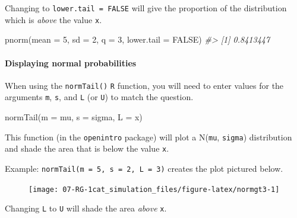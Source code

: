 \documentclass[
]{report}
\newenvironment{Shaded}{\begin{snugshade}}{\end{snugshade}}
\newcommand{\AttributeTok}[1]{\textcolor[rgb]{0.77,0.63,0.00}{#1}}
\newcommand{\CommentTok}[1]{\textcolor[rgb]{0.56,0.35,0.01}{\textit{#1}}}
\newcommand{\ConstantTok}[1]{\textcolor[rgb]{0.00,0.00,0.00}{#1}}
\newcommand{\DecValTok}[1]{\textcolor[rgb]{0.00,0.00,0.81}{#1}}
\newcommand{\FunctionTok}[1]{\textcolor[rgb]{0.00,0.00,0.00}{#1}}
\newcommand{\NormalTok}[1]{#1}
\begin{document}
\newpage

Changing to \texttt{lower.tail\ =\ FALSE} will give the proportion of the distribution which is \emph{above} the value \texttt{x}.

\begin{Shaded}
\begin{Highlighting}[]
\FunctionTok{pnorm}\NormalTok{(}\AttributeTok{mean =} \DecValTok{5}\NormalTok{, }\AttributeTok{sd =} \DecValTok{2}\NormalTok{, }\AttributeTok{q =} \DecValTok{3}\NormalTok{, }\AttributeTok{lower.tail =} \ConstantTok{FALSE}\NormalTok{)}
\CommentTok{\#\textgreater{} [1] 0.8413447}
\end{Highlighting}
\end{Shaded}

\hypertarget{displaying-normal-probabilities}{%
\paragraph*{Displaying normal probabilities}\label{displaying-normal-probabilities}}

When using the \texttt{normTail()} \texttt{R} function, you will need to enter values for the arguments \texttt{m}, \texttt{s}, and \texttt{L} (or \texttt{U}) to match the question.

\begin{Shaded}
\begin{Highlighting}[]
\FunctionTok{normTail}\NormalTok{(}\AttributeTok{m =}\NormalTok{ mu, }\AttributeTok{s =}\NormalTok{ sigma, }\AttributeTok{L =}\NormalTok{ x)}
\end{Highlighting}
\end{Shaded}

This function (in the \texttt{openintro} package) will plot a N(\texttt{mu}, \texttt{sigma}) distribution and shade the area that is below the value \texttt{x}.

Example: \texttt{normTail(m\ =\ 5,\ s\ =\ 2,\ L\ =\ 3)} creates the plot pictured below.

\begin{figure}

{\centering \texttt{[image: 07-RG-1cat\_simulation\_files/figure-latex/normgt3-1]} 

}

\end{figure}

Changing \texttt{L} to \texttt{U} will shade the area \emph{above} \texttt{x}.
\end{document}
